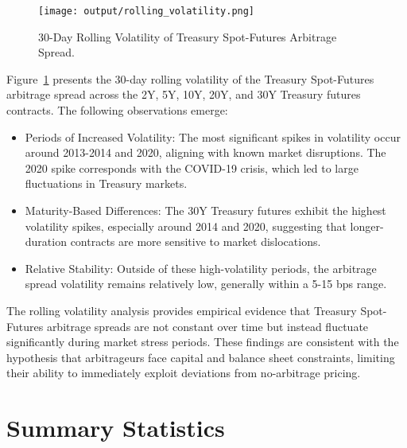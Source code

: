 \documentclass{article}
\begin{document}
\begin{figure}[h]
  \centering
  \texttt{[image: output/rolling\_volatility.png]}
  \caption{30-Day Rolling Volatility of Treasury Spot-Futures Arbitrage Spread.}
  \label{fig:rolling_volatility}
\end{figure}



Figure~\ref{fig:rolling_volatility} presents the 30-day rolling volatility of the Treasury Spot-Futures arbitrage spread across the 2Y, 5Y, 10Y, 20Y, and 30Y Treasury futures contracts. The following observations emerge:

\begin{itemize}
    \item Periods of Increased Volatility: The most significant spikes in volatility occur around 2013-2014 and 2020, aligning with known market disruptions. The 2020 spike corresponds with the COVID-19 crisis, which led to large fluctuations in Treasury markets.
    \item Maturity-Based Differences: The 30Y Treasury futures exhibit the highest volatility spikes, especially around 2014 and 2020, suggesting that longer-duration contracts are more sensitive to market dislocations.
    \item Relative Stability: Outside of these high-volatility periods, the arbitrage spread volatility remains relatively low, generally within a 5-15 bps range.
\end{itemize}

The rolling volatility analysis provides empirical evidence that Treasury Spot-Futures arbitrage spreads are not constant over time but instead fluctuate significantly during market stress periods. These findings are consistent with the hypothesis that arbitrageurs face capital and balance sheet constraints, limiting their ability to immediately exploit deviations from no-arbitrage pricing.




\newpage


\section{Summary Statistics}
\end{document}
